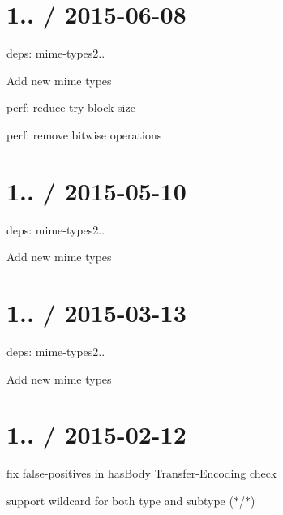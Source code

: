 \section*{1.. / 2015-\/06-\/08 }


\begin{DoxyItemize}
\item deps\+: mime-\/types2..
\begin{DoxyItemize}
\item Add new mime types
\end{DoxyItemize}
\item perf\+: reduce try block size
\item perf\+: remove bitwise operations
\end{DoxyItemize}

\section*{1.. / 2015-\/05-\/10 }


\begin{DoxyItemize}
\item deps\+: mime-\/types2..
\begin{DoxyItemize}
\item Add new mime types
\end{DoxyItemize}
\end{DoxyItemize}

\section*{1.. / 2015-\/03-\/13 }


\begin{DoxyItemize}
\item deps\+: mime-\/types2..
\begin{DoxyItemize}
\item Add new mime types
\end{DoxyItemize}
\end{DoxyItemize}

\section*{1.. / 2015-\/02-\/12 }


\begin{DoxyItemize}
\item fix false-\/positives in {\ttfamily has\+Body} {\ttfamily Transfer-\/\+Encoding} check
\item support wildcard for both type and subtype ({\ttfamily $\ast$/$\ast$})
\end{DoxyItemize}

